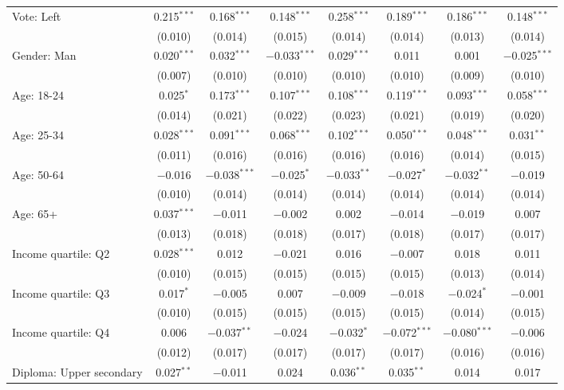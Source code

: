 \begin{tabular}{@{\extracolsep{5pt}}lccccccc}
  Vote: Left & 0.215$^{***}$ & 0.168$^{***}$ & 0.148$^{***}$ & 0.258$^{***}$ & 0.189$^{***}$ & 0.186$^{***}$ & 0.148$^{***}$ \\ 
  & (0.010) & (0.014) & (0.015) & (0.014) & (0.014) & (0.013) & (0.014) \\ 
  Gender: Man & 0.020$^{***}$ & 0.032$^{***}$ & $-$0.033$^{***}$ & 0.029$^{***}$ & 0.011 & 0.001 & $-$0.025$^{***}$ \\ 
  & (0.007) & (0.010) & (0.010) & (0.010) & (0.010) & (0.009) & (0.010) \\ 
  Age: 18\mbox{-}24 & 0.025$^{*}$ & 0.173$^{***}$ & 0.107$^{***}$ & 0.108$^{***}$ & 0.119$^{***}$ & 0.093$^{***}$ & 0.058$^{***}$ \\ 
  & (0.014) & (0.021) & (0.022) & (0.023) & (0.021) & (0.019) & (0.020) \\ 
  Age: 25\mbox{-}34 & 0.028$^{***}$ & 0.091$^{***}$ & 0.068$^{***}$ & 0.102$^{***}$ & 0.050$^{***}$ & 0.048$^{***}$ & 0.031$^{**}$ \\ 
  & (0.011) & (0.016) & (0.016) & (0.016) & (0.016) & (0.014) & (0.015) \\ 
  Age: 50\mbox{-}64 & $-$0.016 & $-$0.038$^{***}$ & $-$0.025$^{*}$ & $-$0.033$^{**}$ & $-$0.027$^{*}$ & $-$0.032$^{**}$ & $-$0.019 \\ 
  & (0.010) & (0.014) & (0.014) & (0.014) & (0.014) & (0.014) & (0.014) \\ 
  Age: 65+ & 0.037$^{***}$ & $-$0.011 & $-$0.002 & 0.002 & $-$0.014 & $-$0.019 & 0.007 \\ 
  & (0.013) & (0.018) & (0.018) & (0.017) & (0.018) & (0.017) & (0.017) \\ 
  Income quartile: Q2 & 0.028$^{***}$ & 0.012 & $-$0.021 & 0.016 & $-$0.007 & 0.018 & 0.011 \\ 
  & (0.010) & (0.015) & (0.015) & (0.015) & (0.015) & (0.013) & (0.014) \\ 
  Income quartile: Q3 & 0.017$^{*}$ & $-$0.005 & 0.007 & $-$0.009 & $-$0.018 & $-$0.024$^{*}$ & $-$0.001 \\ 
  & (0.010) & (0.015) & (0.015) & (0.015) & (0.015) & (0.014) & (0.015) \\ 
  Income quartile: Q4 & 0.006 & $-$0.037$^{**}$ & $-$0.024 & $-$0.032$^{*}$ & $-$0.072$^{***}$ & $-$0.080$^{***}$ & $-$0.006 \\ 
  & (0.012) & (0.017) & (0.017) & (0.017) & (0.017) & (0.016) & (0.016) \\ 
  Diploma: Upper secondary & 0.027$^{**}$ & $-$0.011 & 0.024 & 0.036$^{**}$ & 0.035$^{**}$ & 0.014 & 0.017 \\ 

\end{tabular}
